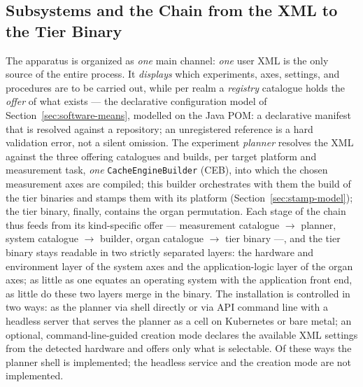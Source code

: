 \begin{nurlang}
\subsection{Subsystems and the Chain from the XML to the Tier Binary}\label{sec:mess-chain}
The apparatus is organized as \emph{one} main channel: \emph{one} user XML is the only
source of the entire process. It \emph{displays} which experiments, axes, settings, and
procedures are to be carried out, while per realm a \emph{registry} catalogue holds the \emph{offer} of what
exists --- the declarative configuration model of Section~\ref{sec:software-means},
modelled on the Java POM\@: a declarative manifest that is resolved against a repository;
an unregistered reference is a hard validation error, not a silent omission. The
experiment \emph{planner} resolves the XML against the three offering catalogues and builds, per
target platform and measurement task, \emph{one} \texttt{CacheEngineBuilder} (CEB), into which the chosen
measurement axes are compiled; this builder orchestrates with them the build of the tier binaries
and stamps them with its platform (Section~\ref{sec:stamp-model}); the tier binary,
finally, contains the organ permutation. Each stage of the chain thus feeds from its kind-specific
offer --- measurement catalogue $\to$ planner, system catalogue $\to$ builder, organ catalogue $\to$
tier binary ---, and the tier binary stays readable in two strictly separated layers: the
hardware and environment layer of the system axes and the application-logic layer of the organ axes;
as little as one equates an operating system with the application front end, as little do
these two layers merge in the binary. The installation is controlled in two ways: as the planner via shell directly
or via API command line with a headless server that serves the planner as a cell on Kubernetes or bare
metal; an optional, command-line-guided creation mode declares the available
XML settings from the detected hardware and offers only what is selectable. Of these ways the
planner shell is implemented; the headless service and the creation mode are not implemented.


\end{nurlang}
